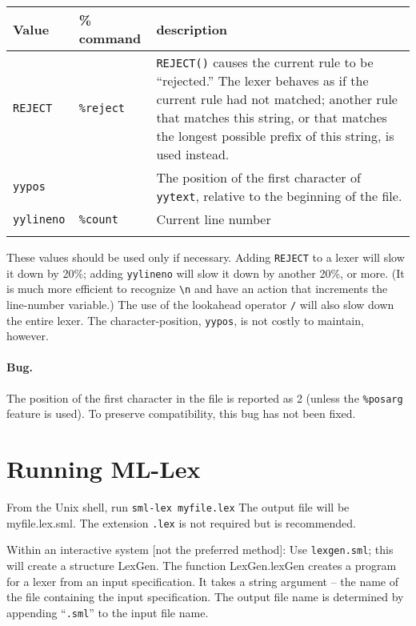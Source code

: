 \begin{tabular}{lll}
\\
{\bf Value}&{\bf \% command}&{\bf description}\\
\hline
{\tt REJECT} &{\tt\%reject}&\parbox[t]{2.6in}{{\tt REJECT()} causes the current
                                        rule to be ``rejected.''
                                        The lexer behaves as if the
                                        current rule had not matched;
                                        another rule that matches this
                                        string, or that matches the longest
                                        possible prefix of this string,
                                        is used instead.} \\
{\tt yypos} & & \parbox[t]{2.6in}{The position of the first character
of {\tt yytext}, relative to the beginning of the file.}\\
{\tt yylineno } & {\tt \%count} &         Current line number\\
\\
\end{tabular}
        

These values should be used only if necessary.  Adding {\tt REJECT} to a
lexer will slow it down by 20\%; adding {\tt yylineno} will slow it down by
another 20\%, or more.  (It is much more efficient to 
recognize \verb|\n| and
have an action that increments the line-number variable.)  The use of
the lookahead operator {\tt /} will also slow down the entire lexer.
The character-position, {\tt yypos}, is not costly to maintain, however.

\paragraph{Bug.} The position of the first character in the file
is reported as 2 (unless the {\tt \%posarg} feature is used).
To preserve compatibility, this bug has not been fixed.

\section{Running ML-Lex}

From the Unix shell, run    {\tt sml-lex~myfile.lex}
The output file will be myfile.lex.sml.  The extension {\tt .lex} is not
required but is recommended.

Within an interactive system [not the preferred method]:
Use {\tt lexgen.sml}; this will create a structure LexGen.  The function
LexGen.lexGen creates a program for a lexer from an input
specification.  It takes a string argument -- the name of the file
containing the input specification.  The output file name is
determined by appending ``{\tt .sml}'' to the input file name.

